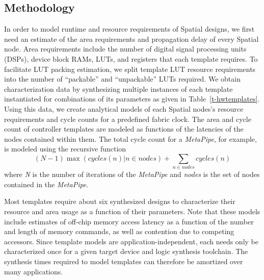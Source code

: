 \subsection{Methodology}
In order to model runtime and resource requirements of Spatial designs, we first need an estimate of the area requirements and
propagation delay of every Spatial node. Area requirements include the number of digital signal processing
units (DSPs), device block RAMs, LUTs, and registers that each template requires. To facilitate LUT packing estimation,
we split template LUT resource requirements into the number of ``packable'' and ``unpackable'' LUTs required.
We obtain characterization data by synthesizing multiple instances of each template instantiated for combinations of its parameters as given in Table~\ref{t-hwtemplates}.
Using this data, we create analytical models of each Spatial nodes's resource requirements and cycle counts for
a predefined fabric clock. The area and cycle count of controller templates are modeled as functions of the latencies of the nodes contained within them.
The total cycle count for a \emph{MetaPipe}, for example, is modeled using the recursive function
\begin{displaymath}
(N-1)\max(cycles(n) | n \in nodes) + \sum_{n \in nodes} cycles(n)
\end{displaymath}
where \emph{N} is the number of iterations of the \emph{MetaPipe} and \emph{nodes} is the set of nodes contained in the \emph{MetaPipe}.

Most templates require about six synthesized designs to characterize their resource and area usage as a function of their parameters. Note that these models include estimates of off-chip memory access latency as a function of the
number and length of memory commands, as well as contention due to competing accessors. Since template models are application-independent, each needs only be characterized once for a given target device and logic synthesis toolchain. The synthesis times required to model templates can therefore be amortized over many applications.

